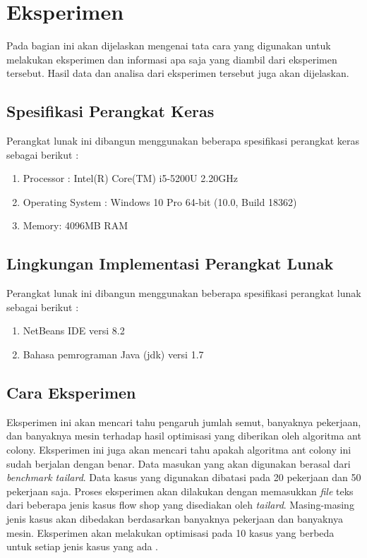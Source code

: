 \section{Eksperimen}

Pada bagian ini akan dijelaskan mengenai tata cara yang digunakan untuk melakukan eksperimen
dan informasi apa saja yang diambil dari eksperimen tersebut. Hasil data dan analisa dari eksperimen
tersebut juga akan dijelaskan.

\subsection{Spesifikasi Perangkat Keras}

Perangkat lunak ini dibangun menggunakan beberapa spesifikasi perangkat keras sebagai berikut :
\begin{enumerate}
	\item  Processor : Intel(R) Core(TM) i5-5200U 2.20GHz 
	\item  Operating System : Windows 10 Pro 64-bit (10.0, Build 18362) 
	\item  Memory: 4096MB RAM
\end{enumerate}

\subsection{Lingkungan Implementasi Perangkat Lunak}

Perangkat lunak ini dibangun menggunakan beberapa spesifikasi perangkat lunak sebagai berikut :
\begin{enumerate}
	\item NetBeans IDE versi 8.2
	\item Bahasa pemrograman Java (jdk) versi 1.7
	
\end{enumerate}

\subsection{Cara Eksperimen}

Eksperimen ini akan mencari tahu pengaruh jumlah semut, banyaknya pekerjaan, dan banyaknya mesin terhadap hasil optimisasi yang diberikan oleh algoritma ant colony. Eksperimen ini juga akan mencari tahu apakah algoritma ant colony ini sudah berjalan dengan benar. Data masukan yang akan digunakan berasal dari \textit{benchmark tailard}. Data kasus yang digunakan dibatasi pada 20 pekerjaan dan 50 pekerjaan saja. Proses eksperimen akan dilakukan dengan memasukkan \textit{file} teks dari beberapa jenis kasus flow shop yang disediakan oleh \textit{tailard}. Masing-masing jenis kasus akan dibedakan berdasarkan banyaknya pekerjaan dan banyaknya mesin. Eksperimen akan melakukan optimisasi pada 10 kasus yang berbeda untuk setiap jenis kasus yang ada .


